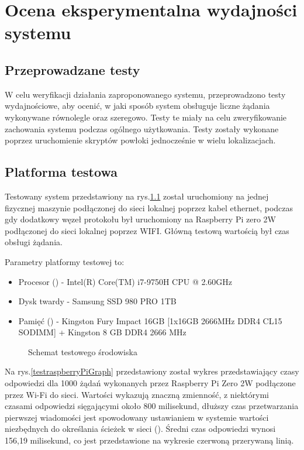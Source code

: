 \chapter{Ocena eksperymentalna wydajności systemu}

\section{Przeprowadzane testy}

W celu weryfikacji działania zaproponowanego systemu, przeprowadzono testy wydajnościowe, aby ocenić, w jaki sposób system obsługuje liczne żądania wykonywane równolegle oraz szeregowo. Testy te miały na celu zweryfikowanie zachowania systemu podczas ogólnego użytkowania. Testy zostały wykonane poprzez uruchomienie skryptów powłoki jednocześnie w wielu lokalizacjach.

\section{Platforma testowa}

Testowany system przedstawiony na rys.\ref{testowySystemSchemat} został uruchomiony na jednej fizycznej maszynie podłączonej do sieci lokalnej poprzez kabel ethernet, podczas gdy dodatkowy węzeł protokołu był uruchomiony na Raspberry Pi zero 2W podłączonej do sieci lokalnej poprzez WIFI. Główną testową wartością był czas obsługi żądania.

Parametry platformy testowej to:

\begin{itemize}
    \item Procesor  () - Intel(R) Core(TM) i7-9750H CPU @ 2.60GHz
    \item Dysk twardy - Samsung SSD 980 PRO 1TB
    \item Pamięć  () - Kingston Fury Impact 16GB [1x16GB 2666MHz DDR4 CL15 SODIMM] + Kingston 8 GB DDR4 2666 MHz
\end{itemize}


\begin{figure}
    \centering
    
    \caption{Schemat testowego środowiska}
    \label{testowySystemSchemat}
\end{figure}

Na rys.\ref{testraspberryPiGraph} przedstawiony został wykres przedstawiający czasy odpowiedzi dla 1000 żądań wykonanych przez Raspberry Pi Zero 2W podłączone przez Wi-Fi do sieci. Wartości wykazują znaczną zmienność, z niektórymi czasami odpowiedzi sięgającymi około 800 milisekund, dłuższy czas przetwarzania pierwszej wiadomości jest spowodowany ustawianiem w systemie wartości niezbędnych do określania ścieżek w sieci  (). Średni czas odpowiedzi wynosi 156,19 milisekund, co jest przedstawione na wykresie czerwoną przerywaną linią.


